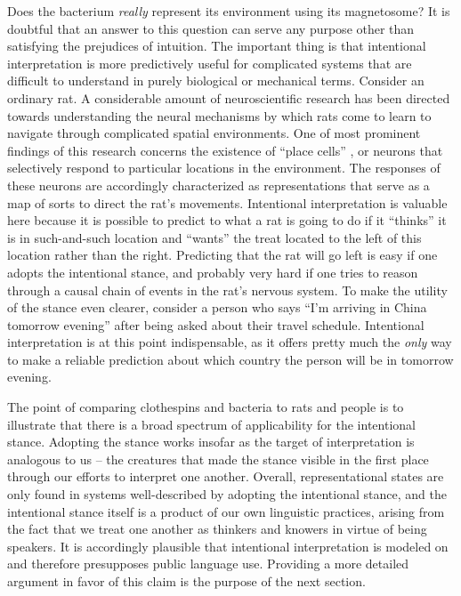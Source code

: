 Does the bacterium \textit{really} represent its environment using its magnetosome? It is doubtful that an answer to this question can serve any purpose other than satisfying the prejudices of intuition. The important thing is that intentional interpretation is more predictively useful for complicated systems that are difficult to understand in purely biological or mechanical terms. Consider an ordinary rat. A considerable amount of neuroscientific research has been directed towards understanding the neural mechanisms by which rats come to learn to navigate through complicated spatial environments. One of most prominent findings of this research concerns the existence of ``place cells'' \citep{McNaughton:1993}, or neurons that selectively respond to particular locations in the environment. The responses of these neurons are accordingly characterized as representations that serve as a map of sorts to direct the rat's movements. Intentional interpretation is valuable here because it is possible to predict to what a rat is going to do if it ``thinks'' it is in such-and-such location and ``wants'' the treat located to the left of this location rather than the right. Predicting that the rat will go left is easy if one adopts the intentional stance, and probably very hard if one tries to reason through a causal chain of events in the rat's nervous system. To make the utility of the stance even clearer, consider a person who says ``I'm arriving in China tomorrow evening'' after being asked about their travel schedule. Intentional interpretation is at this point indispensable, as it offers pretty much the \textit{only} way to make a reliable prediction about which country the person will be in tomorrow evening. 

The point of comparing clothespins and bacteria to rats and people is to illustrate that there is a broad spectrum of applicability for the intentional stance. Adopting the stance works insofar as the target of interpretation is analogous to us -- the creatures that made the stance visible in the first place through our efforts to interpret one another. Overall, representational states are only found in systems well-described by adopting the intentional stance, and the intentional stance itself is a product of our own linguistic practices, arising from the fact that we treat one another as thinkers and knowers in virtue of being speakers. It is accordingly plausible that intentional interpretation is modeled on and therefore presupposes public language use. Providing a more detailed argument in favor of this claim is the purpose of the next section. 

